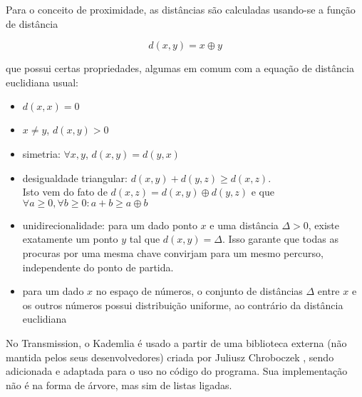 Para o conceito de proximidade, as distâncias são calculadas usando-se a função de
distância

\begin{equation}
    d(x,y) = x \oplus y
\end{equation}

que possui certas propriedades, algumas em comum com a equação de distância euclidiana
usual:

\begin{itemize}
    \item $d(x,x) = 0$
    \item $x \neq y$, $d(x,y) > 0$
    \item simetria: $\forall x,y$, $d(x,y) = d(y,x)$
    \item desigualdade triangular: $d(x,y) + d(y,z) \geq d(x,z)$. \\
        Isto vem do fato de $d(x,z) = d(x,y) \oplus d(y,z)$ e que $\forall a \geq 0,
        \forall b \geq 0 : a + b \geq a \oplus b$
    \item unidirecionalidade: para um dado ponto $x$ e uma distância $\Delta > 0$,
        existe exatamente um ponto $y$ tal que $d(x,y) = \Delta$. Isso garante que todas
        as procuras por uma mesma chave convirjam para um mesmo percurso, independente
        do ponto de partida.
    \item para um dado $x$ no espaço de números, o conjunto de distâncias $\Delta$ entre
        $x$ e os outros números possui distribuição uniforme, ao contrário da distância
        euclidiana \cite{bittorrentcom:dht}
\end{itemize}

No Transmission, o Kademlia é usado a partir de uma biblioteca externa (não mantida
pelos seus desenvolvedores) criada por Juliusz Chroboczek \cite{repo:dht-c}, sendo
adicionada e adaptada para o uso no código do programa. Sua implementação não é na forma
de árvore, mas sim de listas ligadas.

